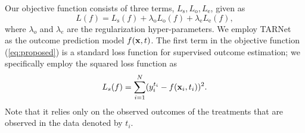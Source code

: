 Our objective function consists of three terms, $L_\text{s}, L_\text{o}, L_\text{e}$, given as
\begin{equation}\label{eq:proposed}
L(f) = L_\text{s}(f) +\lambda_\text{o}L_\text{o}(f) +\lambda_\text{e}L_\text{e}(f),
\end{equation}
where $\lambda_o$ and $\lambda_e$ are the regularization hyper-parameters. 
We employ TARNet~\cite{shalit2017estimating} as the outcome prediction model $f(\mathbf x, t)$.
The first term in the objective function (\ref{eq:proposed})  is a standard loss function for supervised outcome estimation; we specifically employ the squared loss function as
\begin{equation}
\label{eq:supervised}
L_s(f)=\sum_{i=1}^{N}(y^{t_i}_i-f(\mathbf x_i, t_i))^{2}.
\end{equation}
Note that it relies only on the observed outcomes of the treatments that are observed in the data denoted by $t_i$.

